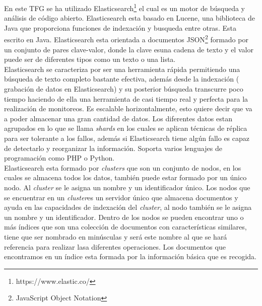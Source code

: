 En este TFG se ha utilizado Elasticsearch\footnote{https://www.elastic.co/} el cual es un motor de búsqueda y análisis de código abierto. Elasticsearch esta basado en Lucene, una biblioteca de Java que proporciona funciones de indexación y busqueda entre otras. Esta escrito en Java. Elasticsearch esta orientada a documentos JSON\footnote{JavaScript Object Notation} formado por un conjunto de pares clave-valor, donde la clave esuna cadena de texto y el valor puede ser de diferentes tipos como un texto o una lista.\cite{elastic}\\

Elasticsearch se caracteriza por ser una herramienta rápida permitiendo una búsqueda de texto completo bastante efectiva, además desde la indexación ( grabación de datos en Elasticsearch) y su posterior búsqueda transcurre poco tiempo haciendo de ella una herramienta de casi tiempo real y perfecta para la realización de monitoreos. Es escalable horizontalmente, esto quiere decir que va a poder almacenar una gran cantidad de datos. Los diferentes datos estan agrupados en lo que se llama \textit{shards} en los cuales se aplican técnicas de réplica para ser tolerante a los fallos, además si Elasticsearch tiene algún fallo es capaz de detectarlo y reorganizar la información. Soporta varios lenguajes de programación como PHP o Python.\cite{elastic2}\\

Elasticsearch esta formado por \textit{clusters} que son un conjunto de nodos, en los cuales se almacena todos los datos, también puede estar formado por un único nodo. Al \textit{cluster} se le asigna un nombre y un identificador único. Los nodos que se encuentrar en un \textit{cluster}es un servidor único que almacena documentos y ayuda en las capacidades de indexación del \textit{cluster}, al nodo también se le asigna un nombre y un identificador. Dentro de los nodos se pueden encontrar uno o más índices que son una colección de documentos con características similares, tiene que ser nombrado en minúsculas y será este nombre al que se hará referencia para realizar lasa diferentes operaciones. Los documentos que encontramos en un índice esta formada por la información básica que es recogida.\cite{elastic3}\\




